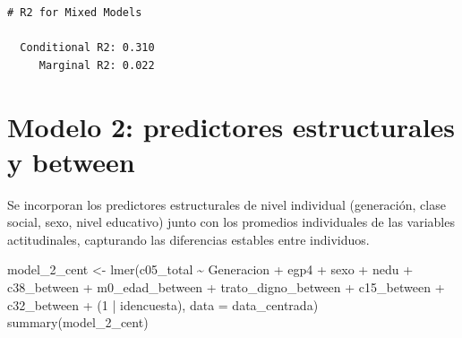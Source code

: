 \documentclass[
  spanish,
  a4paper,
  oneside]{scrbook}
\newenvironment{Shaded}{\begin{snugshade}}{\end{snugshade}}
\newcommand{\AttributeTok}[1]{\textcolor[rgb]{0.40,0.45,0.13}{#1}}
\newcommand{\DecValTok}[1]{\textcolor[rgb]{0.68,0.00,0.00}{#1}}
\newcommand{\FunctionTok}[1]{\textcolor[rgb]{0.28,0.35,0.67}{#1}}
\newcommand{\NormalTok}[1]{\textcolor[rgb]{0.00,0.23,0.31}{#1}}
\newcommand{\OtherTok}[1]{\textcolor[rgb]{0.00,0.23,0.31}{#1}}
\newcommand{\SpecialCharTok}[1]{\textcolor[rgb]{0.37,0.37,0.37}{#1}}
\begin{document}
\begin{verbatim}
# R2 for Mixed Models

  Conditional R2: 0.310
     Marginal R2: 0.022
\end{verbatim}

\section{Modelo 2: predictores estructurales y
between}\label{modelo-2-predictores-estructurales-y-between}

Se incorporan los predictores estructurales de nivel individual
(generación, clase social, sexo, nivel educativo) junto con los
promedios individuales de las variables actitudinales, capturando las
diferencias estables entre individuos.

\begin{Shaded}
\begin{Highlighting}[]
\NormalTok{model\_2\_cent }\OtherTok{\textless{}{-}} \FunctionTok{lmer}\NormalTok{(c05\_total }\SpecialCharTok{\textasciitilde{}} 
\NormalTok{                       Generacion }\SpecialCharTok{+}\NormalTok{ egp4 }\SpecialCharTok{+}\NormalTok{ sexo }\SpecialCharTok{+}\NormalTok{ nedu }\SpecialCharTok{+}
\NormalTok{                       c38\_between }\SpecialCharTok{+}\NormalTok{ m0\_edad\_between }\SpecialCharTok{+}
\NormalTok{                       trato\_digno\_between }\SpecialCharTok{+}\NormalTok{ c15\_between }\SpecialCharTok{+}\NormalTok{ c32\_between }\SpecialCharTok{+}
\NormalTok{                       (}\DecValTok{1} \SpecialCharTok{|}\NormalTok{ idencuesta), }\AttributeTok{data =}\NormalTok{ data\_centrada)}
\FunctionTok{summary}\NormalTok{(model\_2\_cent)}
\end{Highlighting}
\end{Shaded}
\end{document}
